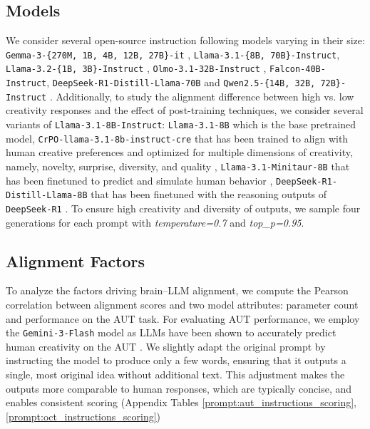 
\subsection{Models}
\label{sec:models}
We consider several open-source instruction following models varying in their size: \texttt{Gemma-3-\{270M, 1B, 4B, 12B, 27B\}-it} \citep{kamath2025gemma}, \texttt{Llama-3.1-\{8B, 70B\}-Instruct}, \texttt{Llama-3.2-\{1B, 3B\}-Instruct} \citep{grattafiori2024llama}, \texttt{Olmo-3.1-32B-Instruct} \citep{olmo2025olmo3}, \texttt{Falcon-40B-Instruct}, \texttt{DeepSeek-R1-Distill-Llama-70B} \citep{deepseekai2025deepseekr1incentivizingreasoningcapability} and \texttt{Qwen2.5-\{14B, 32B, 72B\}-Instruct} \citep{qwen2.5, qwen2}. Additionally, to study the alignment difference between high vs. low creativity responses and the effect of post-training techniques, we consider several variants of \texttt{Llama-3.1-8B-Instruct}: \texttt{Llama-3.1-8B} which is the base pretrained model, \texttt{CrPO-llama-3.1-8b-instruct-cre} that has been trained to align with human creative preferences and optimized for multiple dimensions of creativity, namely, novelty, surprise, diversity, and quality \citep{ismayilzada-etal-2025-creative}, \texttt{Llama-3.1-Minitaur-8B} that has been finetuned to predict and simulate human behavior \citep{binz2025foundation}, \texttt{DeepSeek-R1-Distill-Llama-8B} that has been finetuned with the reasoning outputs of \texttt{DeepSeek-R1} \citep{deepseekai2025deepseekr1incentivizingreasoningcapability}. To ensure high creativity and diversity of outputs, we sample four generations for each prompt with \textit{temperature=0.7} and \textit{top\_p=0.95}.

\subsection{Alignment Factors}
To analyze the factors driving brain–LLM alignment, we compute the Pearson correlation between alignment scores and two model attributes: parameter count and performance on the AUT task. 
For evaluating AUT performance, we employ the \texttt{Gemini-3-Flash} \citep{gemini3google} model as LLMs have been shown to accurately predict human creativity on the AUT \citep{saretzki2026investigating, organisciak2023beyond}.
We slightly adapt the original prompt by instructing the model to produce only a few words, ensuring that it outputs a single, most original idea without additional text. This adjustment makes the outputs more comparable to human responses, which are typically concise, and enables consistent scoring (Appendix Tables \ref{prompt:aut_instructions_scoring}, \ref{prompt:oct_instructions_scoring})

